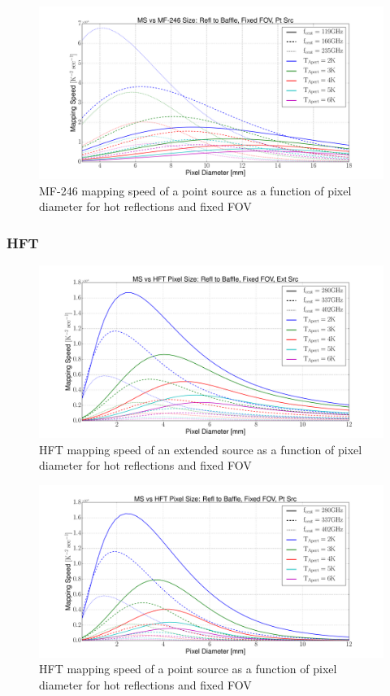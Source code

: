 \documentclass[12pt, titlepage]{article} %
\begin{document}
\begin{figure}[H]
	\centering
	\includegraphics[width=1.1\textwidth, center]{PDF/LFT_MS_MF-246_hotRefl_fixFOV_ptSrc.pdf}
	\caption{MF-246 mapping speed of a point source as a function of pixel diameter for hot reflections and fixed FOV}
\end{figure}


\subsubsection{HFT}

\begin{figure}[H]
	\centering
	\includegraphics[width=1.1\textwidth, center]{PDF/HFT_MS_hotRefl_fixFOV_extSrc.pdf}
	\caption{HFT mapping speed of an extended source as a function of pixel diameter for hot reflections and fixed FOV}
\end{figure}

\begin{figure}[H]
	\centering
	\includegraphics[width=1.1\textwidth, center]{PDF/HFT_MS_hotRefl_fixFOV_ptSrc.pdf}
	\caption{HFT mapping speed of a point source as a function of pixel diameter for hot reflections and fixed FOV}
\end{figure}
\end{document}
